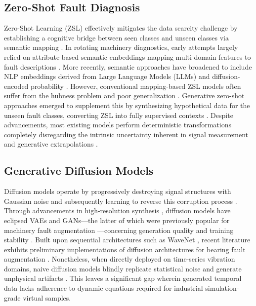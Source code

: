 \subsection{Zero-Shot Fault Diagnosis}
Zero-Shot Learning (ZSL) effectively mitigates the data scarcity challenge by establishing a cognitive bridge between seen classes and unseen classes via semantic mapping \cite{xian2018zero}. In rotating machinery diagnostics, early attempts largely relied on attribute-based semantic embeddings mapping multi-domain features to fault descriptions \cite{lampert2009learning,pourpanah2022review,zhang2023zero}. More recently, semantic approaches have broadened to include NLP embeddings derived from Large Language Models (LLMs) \cite{brown2020language} and diffusion-encoded probability \cite{chen2024semantic}. However, conventional mapping-based ZSL models often suffer from the hubness problem and poor generalization \cite{xian2018zero}. Generative zero-shot approaches emerged to supplement this by synthesizing hypothetical data for the unseen fault classes, converting ZSL into fully supervised contexts \cite{schonfeld2019cada,kingma2013auto}. Despite advancements, most existing models perform deterministic transformations completely disregarding the intrinsic uncertainty inherent in signal measurement and generative extrapolations \cite{gal2016dropout}.

\subsection{Generative Diffusion Models}
Diffusion models \cite{dhariwal2021diffusion,nichol2021improved} operate by progressively destroying signal structures with Gaussian noise and subsequently learning to reverse this corruption process \cite{ho2020denoising}. Through advancements in high-resolution synthesis \cite{rombach2022high}, diffusion models have eclipsed VAEs and GANs—the latter of which were previously popular for machinery fault augmentation \cite{shao2019generative,zhang2022gan}—concerning generation quality and training stability \cite{song2020score,goodfellow2014generative}. Built upon sequential architectures such as WaveNet \cite{oord2016wavenet}, recent literature exhibits preliminary implementations of diffusion architectures for bearing fault augmentation \cite{ho2020denoising}. Nonetheless, when directly deployed on time-series vibration domains, naive diffusion models blindly replicate statistical noise and generate unphysical artifacts \cite{song2020score}. This leaves a significant gap wherein generated temporal data lacks adherence to dynamic equations required for industrial simulation-grade virtual samples.

